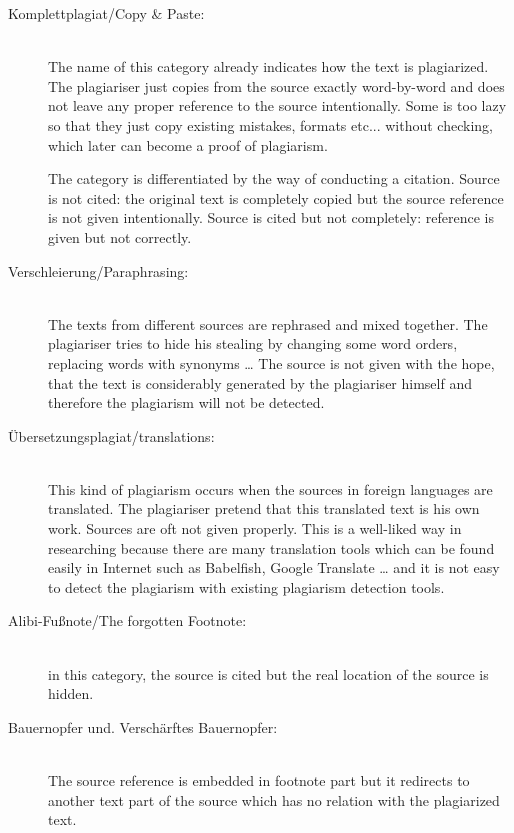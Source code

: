 \begin{description}
\item[Komplettplagiat/Copy \& Paste\citep{one12}:] \hfill \\
The name of this category already indicates how the text is plagiarized. The 
plagiariser just copies from the source exactly word-by-word and does not leave any proper reference to the source 
intentionally. Some is too lazy so that they just copy existing mistakes, formats etc... without checking, which 
later can become a proof of plagiarism.

The category is differentiated by the way of conducting a citation.
Source is not cited: the original text is completely copied but the source reference is not given intentionally.
Source is cited but not completely: reference is given but not correctly.  

\item[Verschleierung/Paraphrasing\citep{PlagiarismSearch}:]  \hfill \\
The texts from different sources are rephrased and mixed together. The plagiariser tries 
to hide his stealing by changing some word orders, replacing words with synonyms … The source is not given with the hope, 
that the text is considerably generated by the plagiariser himself and therefore the plagiarism will not be detected.

\item[Übersetzungsplagiat/translations\citep{one12}:] \hfill \\
This kind of plagiarism occurs when the sources in foreign languages are translated. 
The plagiariser pretend that this translated text is his own work. Sources are oft not given properly. This is a 
well-liked way in researching because there are many translation tools which can be found easily in Internet such as 
Babelfish, Google Translate … and  it is not easy to detect the plagiarism with existing plagiarism detection tools.

\item[Alibi-Fußnote/The forgotten Footnote\citep{PlagiarismSearch}:] \hfill \\
in this category, the source is cited but the real location of the source is 
hidden.  

\item[Bauernopfer und. Verschärftes Bauernopfer:] \hfill \\
The source reference is embedded in footnote part but it redirects to 
another text part of the source which has no relation with the plagiarized text.
\end{description}

